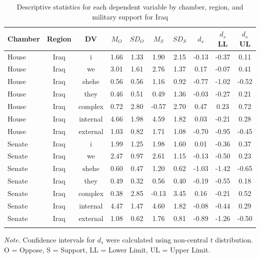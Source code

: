\documentclass[english,,man]{apa6}
\begin{document}
\begin{table}[tbp]
\begin{center}
\begin{threeparttable}
\caption{\label{tab:Itable}Descriptive statistics for each dependent variable by chamber, 
          region, and military support for Iraq}
\small{
\begin{tabular}{lccccccccc}
\toprule
Chamber & Region & DV & $M_O$ & $SD_O$ & $M_S$ & $SD_S$ & $d_s$ & $d_s$ LL & $d_s$ UL\\
\midrule
House & Iraq & i & 1.66 & 1.33 & 1.90 & 2.15 & -0.13 & -0.37 & 0.11\\
House & Iraq & we & 3.01 & 1.61 & 2.76 & 1.37 & 0.17 & -0.07 & 0.41\\
House & Iraq & shehe & 0.56 & 0.56 & 1.16 & 0.92 & -0.77 & -1.02 & -0.52\\
House & Iraq & they & 0.46 & 0.51 & 0.49 & 1.36 & -0.03 & -0.27 & 0.21\\
House & Iraq & complex & 0.72 & 2.80 & -0.57 & 2.70 & 0.47 & 0.23 & 0.72\\
House & Iraq & internal & 4.66 & 1.98 & 4.59 & 1.82 & 0.03 & -0.21 & 0.28\\
House & Iraq & external & 1.03 & 0.82 & 1.71 & 1.08 & -0.70 & -0.95 & -0.45\\
Senate & Iraq & i & 1.99 & 1.25 & 1.98 & 1.60 & 0.01 & -0.36 & 0.37\\
Senate & Iraq & we & 2.47 & 0.97 & 2.61 & 1.15 & -0.13 & -0.50 & 0.23\\
Senate & Iraq & shehe & 0.60 & 0.47 & 1.20 & 0.62 & -1.03 & -1.42 & -0.65\\
Senate & Iraq & they & 0.49 & 0.32 & 0.56 & 0.40 & -0.19 & -0.55 & 0.18\\
Senate & Iraq & complex & 0.38 & 2.85 & -0.13 & 3.45 & 0.16 & -0.21 & 0.52\\
Senate & Iraq & internal & 4.47 & 1.47 & 4.60 & 1.82 & -0.08 & -0.44 & 0.29\\
Senate & Iraq & external & 1.08 & 0.62 & 1.76 & 0.81 & -0.89 & -1.26 & -0.50\\
\bottomrule
\addlinespace
\end{tabular}
}
\begin{tablenotes}[para]
\normalsize{\textit{Note.} Confidence intervals for $d_s$ were calculated using 
          non-central $t$ distribution. O = Oppose, S = Support, LL = Lower Limit, UL = Upper Limit.}
\end{tablenotes}
\end{threeparttable}
\end{center}
\end{table}
\end{document}
